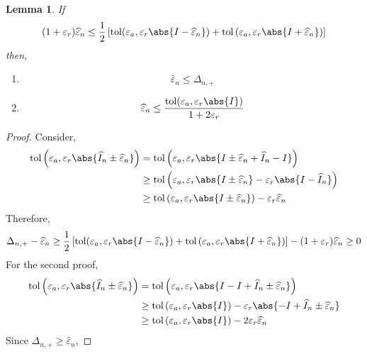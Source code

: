 \documentclass[]{elsarticle}
\newtheorem{lem}{Lemma}
\theoremstyle{definition}
\newcommand{\tol}{\text{tol}}
\begin{document}
\begin{lem}
If
\[
(1+\varepsilon_r)\widehat{\varepsilon}_n \leq \frac 1 2 \left[ \tol(\varepsilon_a,\varepsilon_r\abs{I-\widehat{\varepsilon}_n}) + \tol\left(\varepsilon_a,\varepsilon_r\abs{I+\widehat{\varepsilon}_n}\right)\right]
\]
then,
\begin{enumerate}
\item \[ \widehat{\varepsilon}_n\leq \Delta_{n,+} \]
\item \[ \widehat{\varepsilon}_n\leq \frac{\tol(\varepsilon_a,\varepsilon_r\abs{I})}{1+2\varepsilon_r} \]
\end{enumerate}
\end{lem}
\begin{proof}
Consider,
\begin{align*}
\tol\left(\varepsilon_a,\varepsilon_r\abs{\widehat{I}_n\pm\widehat{\varepsilon}_n}\right)&=\tol\left(\varepsilon_a,\varepsilon_r\abs{I\pm\widehat{\varepsilon}_n+\widehat{I}_n-I}\right)\\
& \geq \tol\left(\varepsilon_a,\varepsilon_r\abs{I\pm\widehat{\varepsilon}_n}-\varepsilon_r \abs{I-\widehat{I}_n}\right)\\
& \geq \tol\left(\varepsilon_a,\varepsilon_r\abs{I\pm\widehat{\varepsilon}_n}\right)-\varepsilon_r \widehat{\varepsilon}_n
\end{align*}
Therefore, 
\begin{align*}
\Delta_{n,+}-\widehat{\varepsilon}_n\geq \frac 1 2 \left[ \tol(\varepsilon_a,\varepsilon_r\abs{I-\widehat{\varepsilon}_n}) + \tol\left(\varepsilon_a,\varepsilon_r\abs{I+\widehat{\varepsilon}_n}\right)\right]-(1+\varepsilon_r)\widehat{\varepsilon}_n\geq 0
\end{align*}
For the second proof,
\begin{align*}
\tol\left(\varepsilon_a,\varepsilon_r\abs{\widehat{I}_n\pm\widehat{\varepsilon}_n}\right)&=\tol\left(\varepsilon_a,\varepsilon_r\abs{I-I+\widehat{I}_n\pm\widehat{\varepsilon}_n}\right)\\
& \geq \tol\left(\varepsilon_a,\varepsilon_r\abs{I}\right)-\varepsilon_r\abs{-I+\widehat{I}_n\pm\widehat{\varepsilon}_n} \\
& \geq \tol\left(\varepsilon_a,\varepsilon_r\abs{I}\right)-2\varepsilon_r\widehat{\varepsilon}_n
\end{align*}
Since $\Delta_{n,+}\geq\widehat{\varepsilon}_n$,

\end{proof}
\end{document}
